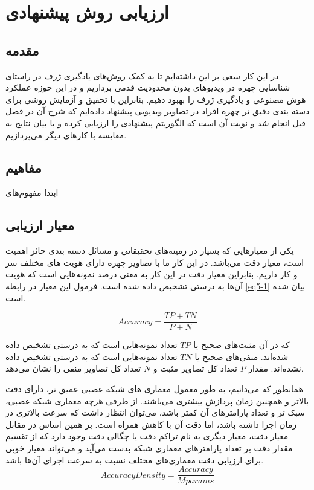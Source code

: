\chapter{ارزیابی روش پیشنهادی}
\section{مقدمه}

در این کار سعی بر این داشته‌ایم تا به کمک روش‌های یادگیری ژرف در راستای شناسایی چهره در ویدیوهای بدون محدودیت قدمی برداریم و در این حوزه عملکرد هوش مصنوعی و یادگیری ژرف را بهبود دهیم. بنابراین با تحقیق و آزمایش روشی برای دسته بندی دقیق تر چهره افراد در تصاویر ویدیویی پیشنهاد داده‌ایم که شرح آن در فصل قبل انجام شد و نوبت آن است که الگوریتم پیشنهادی را ارزیابی کرده و با بیان نتایج به مقایسه با کارهای دیگر می‌پردازیم.

\section{مفاهیم}
ابتدا مفهوم‌های 

\section{معیار ارزیابی}
یکی از معیارهایی که بسیار در زمینه‌های تحقیقاتی و مسائل دسته بندی حائز اهمیت است، معیار دقت می‌باشد. در این کار ما با تصاویر چهره دارای هویت های مختلف سر و کار داریم. بنابراین معیار دقت در این کار به معنی درصد نمونه‌هایی است که هویت آن‌ها به درستی تشخیص داده شده است. فرمول این معیار در رابطه \ref{eq5-1} بیان شده است.

\begin{equation}\label{eq5-1}
Accuracy= \frac{TP+TN}{P+N}
\end{equation}

\noindent
که در آن مثبت‌های صحیح  یا $TP$ تعداد نمونه‌هایی است که به درستی تشخیص داده شده‌اند. منفی‌های صحیح  یا $TN$ تعداد نمونه‌هایی است که به درستی تشخیص داده نشده‌اند. مقدار $P$ تعداد کل تصاویر مثبت و $N$ تعداد کل تصاویر منفی را نشان می‌دهد.

\noindent
همانطور که می‌دانیم، به طور معمول معماری های شبکه عصبی عمیق تر، دارای دقت بالاتر و همچنین زمان پردازش بیشتری می‌باشند. از طرفی هرچه معماری شبکه عصبی، سبک تر و تعداد پارامترهای آن کمتر باشد، می‌توان انتظار داشت که سرعت بالاتری در زمان اجرا داشته باشد، اما دقت آن با کاهش همراه است. بر همین اساس در مقابل معیار دقت، معیار دیگری به نام تراکم دقت یا چگالی دقت وجود دارد که از تقسیم مقدار دقت بر تعداد پارامترهای معماری شبکه بدست می‌آید و می‌تواند معیار خوبی برای ارزیابی دقت معماری‌های مختلف نسبت به سرعت اجرای آن‌ها باشد.
‌\begin{equation}\label{eq5-2}
Accuracy Density = \frac{Accuracy}{Mparams}
\end{equation}

